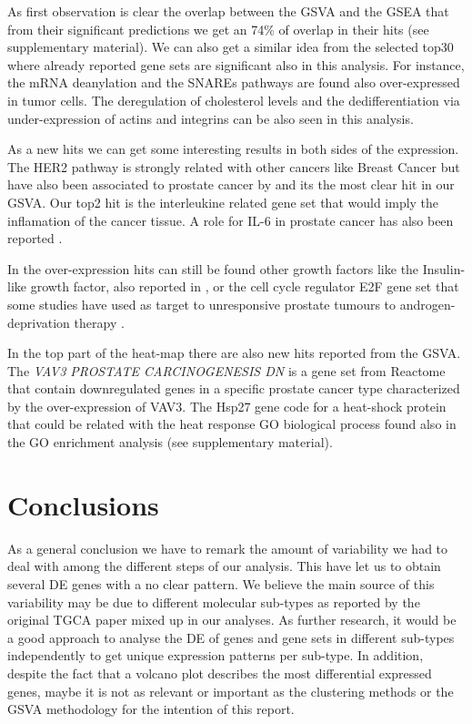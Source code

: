 \documentclass[9pt,twocolumn,twoside]{gsajnl}
\begin{document}
As first observation is clear the overlap between the GSVA and the GSEA that from their significant predictions we get an 74\% of overlap in their hits (see supplementary material). We can also get a similar idea from the selected top30 where already reported gene sets are significant also in this analysis. For instance, the mRNA deanylation and the SNAREs pathways are found also over-expressed in tumor cells. The deregulation of cholesterol levels and the dedifferentiation via under-expression of actins and integrins can be also seen in this analysis.

As a new hits we can get some interesting results in both sides of the expression. The HER2 pathway is strongly related with other cancers like Breast Cancer but have also been associated to prostate cancer by \cite{yeh1999her2} and its the most clear hit in our GSVA. Our top2 hit is the interleukine related gene set that would imply the inflamation of the cancer tissue. A role for IL-6 in prostate cancer has also been reported \citep{chung1999characterization}.

In the over-expression hits can still be found other growth factors like the Insulin-like growth factor, also reported in \cite{hellawell2002expression}, or the cell cycle regulator E2F gene set that some studies have used as target to unresponsive prostate tumours to androgen-deprivation therapy \citep{kaseb2007androgen}.

In the top part of the heat-map there are also new hits reported from the GSVA. The  \textit{VAV3 PROSTATE CARCINOGENESIS DN} \citep{liu2008targeted} is a gene set from Reactome that contain downregulated genes in a specific prostate cancer type characterized by the over-expression of VAV3. The Hsp27 gene code for a heat-shock protein that could be related with the heat response GO biological process found also in the GO enrichment analysis (see supplementary material).



\section*{Conclusions}

As a general conclusion we have to remark the amount of variability we had to deal with among the different steps of our analysis. This have let us to obtain several DE genes with a no clear pattern. We believe the main source of this variability may be due to different molecular sub-types as reported by the original TGCA paper \citep{Abeshouse2015} mixed up in our analyses.  As further research, it would be a good approach to analyse the DE of genes and gene sets in different sub-types independently to get unique expression patterns per sub-type. In addition, despite the fact that a volcano plot describes the most differential expressed genes, maybe it is not as relevant or important as the clustering methods or the GSVA methodology for the intention of this report.
\end{document}

